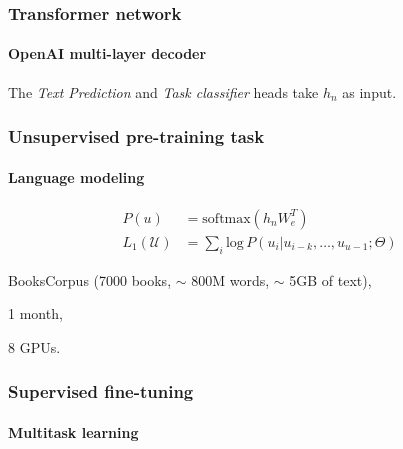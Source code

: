 \documentclass[9pt]{beamer}
\begin{document}
\begin{frame}

  \frametitle{Transformer network}

  \framesubtitle{OpenAI multi-layer decoder}

  \begin{figure}
    
  \end{figure}

  The \emph{Text Prediction} and \emph{Task classifier} heads take
  $h_{n}$ as input.
\end{frame}


\begin{frame}

  \frametitle{Unsupervised pre-training task}

  \framesubtitle{Language modeling}

  \begin{figure}
    \scalebox{0.8}{
      
    }
  \end{figure}

  \begin{align*}
    P(u) &= \text{softmax}(h_{n}W_{e}^{T})\\
    L_{1}(\mathcal{U}) &= \sum_{i} \text{log} \,P(u_{i} | u_{i - k}, \dots, u_{u - 1}; \Theta)
  \end{align*}

  \begin{description}[leftmargin=!,labelwidth=\widthof{\bfseries Hardware}]
  \item[Dataset] BooksCorpus (7000 books, $\sim$ 800M words, $\sim$ 5GB of text),
  \item[Duration] 1 month,
  \item[Hardware] 8 GPUs.
  \end{description}
\end{frame}

\begin{frame}
  \frametitle{Supervised fine-tuning}

  \framesubtitle{Multitask learning}

  \fontsize{7.5pt}{7.2}\selectfont

  \begin{figure}
    
  \end{figure}

\end{frame}
\end{document}
